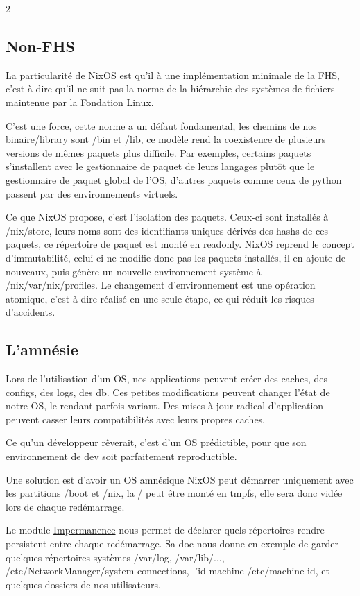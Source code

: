 \documentclass[a4paper,11pt]{article}
\begin{document}
\begin{blogmain}
\begin{multicols}{2}
\subsection{Non-FHS}
La particularité de NixOS est qu'il à une implémentation minimale de la FHS, c'est-à-dire qu'il ne suit pas la norme de la hiérarchie des systèmes de fichiers maintenue par la Fondation Linux.


C'est une force, cette norme a un défaut fondamental, les chemins de nos binaire/library sont /bin et /lib, ce modèle rend la coexistence de plusieurs versions de mêmes paquets plus difficile. Par exemples, certains paquets s'installent avec le gestionnaire de paquet de leurs langages plutôt que le gestionnaire de paquet global de l'OS, d'autres paquets comme ceux de python passent par des environnements virtuels.

Ce que NixOS propose, c'est l'isolation des paquets.
Ceux-ci sont installés à /nix/store, leurs noms sont des identifiants uniques dérivés des hashs de ces paquets, ce répertoire de paquet est monté en readonly.
NixOS reprend le concept d'immutabilité, celui-ci ne modifie donc pas les paquets installés, il en ajoute de nouveaux, puis génère un nouvelle environnement système à /nix/var/nix/profiles.
Le changement d'environnement est une opération atomique, c'est-à-dire réalisé en une seule étape, ce qui réduit les risques d'accidents.

\subsection{L'amnésie}
Lors de l'utilisation d'un OS, nos applications peuvent créer des caches, des configs, des logs, des db.
Ces petites modifications peuvent changer l'état de notre OS, le rendant parfois variant.
Des mises à jour radical d'application peuvent casser leurs compatibilités avec leurs propres caches.

Ce qu'un développeur rêverait, c'est d'un OS prédictible, pour que son environnement de dev soit parfaitement reproductible.

Une solution est d'avoir un OS amnésique
NixOS peut démarrer uniquement avec les partitions /boot et /nix, la / peut être monté en tmpfs, elle sera donc vidée lors de chaque redémarrage.

Le module \href{https://github.com/nix-community/impermanence}{Impermanence} nous permet de déclarer quels répertoires rendre persistent entre chaque redémarrage.
Sa doc nous donne en exemple de garder quelques répertoires systèmes /var/log, /var/lib/..., /etc/NetworkManager/system-connections, l'id machine /etc/machine-id, et quelques dossiers de nos utilisateurs.


\end{multicols}
\end{blogmain}
\end{document}
